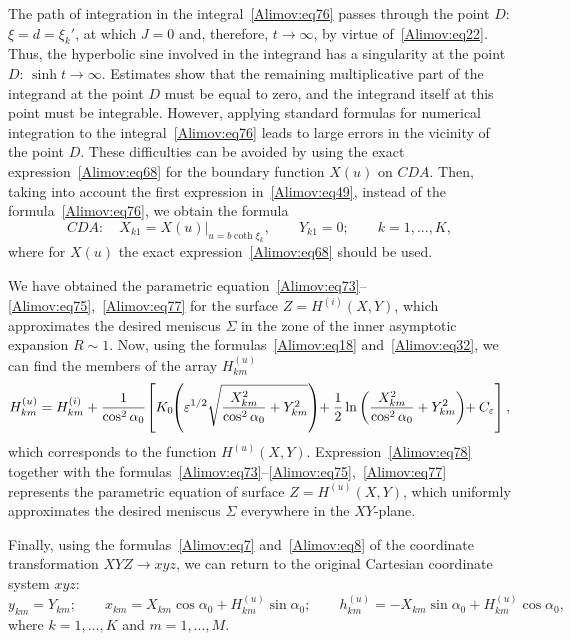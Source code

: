 \documentclass[
11pt,%
tightenlines,%
twoside,%
onecolumn,%
nofloats,%
nobibnotes,%
nofootinbib,%
superscriptaddress,%
noshowpacs,%
centertags]%
{revtex4-2}
\begin{document}
The path of integration in the integral~\eqref{Alimov:eq76} passes through the point $D$: $\xi = d
= \xi_{k}'$, at which $J = 0$ and, therefore, $t \to \infty $, by virtue of~\eqref{Alimov:eq22}.
Thus, the hyperbolic sine involved in the integrand has a singularity at the point $D$: $\sinh t \to
\infty $. Estimates show that the remaining multiplicative part of the integrand at the point $D$
must be equal to zero, and the integrand itself at this point must be integrable. However, applying
standard formulas for numerical integration to the integral~\eqref{Alimov:eq76} leads to large
errors in the vicinity of the point $D$. These difficulties can be avoided by using the exact
expression~\eqref{Alimov:eq68} for the boundary function $X(u)$ on $CDA$. Then, taking into account
the first expression in~\eqref{Alimov:eq49}, instead of the formula~\eqref{Alimov:eq76}, we obtain
the formula
\begin{equation}
\label{Alimov:eq77} CDA: \quad X_{k1} = \left. {X(u)} \right|_{u = b \coth \xi_k }, \quad \quad
Y_{k1} = 0; \quad \quad k = 1,...,K,
\end{equation}
where for $X(u)$ the exact expression~\eqref{Alimov:eq68} should be used.

We have obtained the parametric
equation~\eqref{Alimov:eq73}--\eqref{Alimov:eq75},~\eqref{Alimov:eq77} for the surface $Z =
H^{(i)}(X,Y)$, which approximates the desired meniscus $\Sigma$ in the zone of the inner asymptotic
expansion $R \sim 1$. Now, using the formulas~\eqref{Alimov:eq18} and~\eqref{Alimov:eq32}, we can
find the members of the array $H_{km}^{(u)}$
\begin{equation}
\label{Alimov:eq78} H_{km}^{(u)} =  H_{km}^{(i)} + \frac{1}{\cos^2\alpha_0 }\hspace{-0.5mm}\left[
{K_0\hspace{-1mm}\left( {\varepsilon^{1/2} \sqrt {\frac{X_{km}^2}{\cos^2\alpha_0} + Y_{km}^2}}
\right)\hspace{-1mm} + \frac{1}{2}\ln \left( {\frac{X_{km}^2}{\cos^2\alpha_0} + Y_{km}^2 }
\right)\hspace{-1mm} + C_\varepsilon} \right],
\end{equation}
which corresponds to the function $H^{(u)}(X,Y)$. Expression~\eqref{Alimov:eq78} together
with the formulas~\eqref{Alimov:eq73}--\eqref{Alimov:eq75},~\eqref{Alimov:eq77} represents the
parametric equation of surface $Z = H^{(u)}(X,Y)$, which uniformly approximates the desired
meniscus $\Sigma $ everywhere in the $XY$-plane.

Finally, using the formulas~\eqref{Alimov:eq7} and~\eqref{Alimov:eq8} of the coordinate
transformation $XYZ \to xyz$, we can return to the original Cartesian coordinate system $xyz$:
\begin{equation}
\label{Alimov:eq79} y_{km} = Y_{km}; \quad \quad x_{km} = X_{km} \cos \alpha_0 + H_{km}^{(u)} \sin
\alpha_0; \quad \quad h_{km}^{(u)} = - X_{km} \sin \alpha_0 + H_{km}^{(u)} \cos \alpha_0,
\end{equation}
where $k = 1,...,K$ and $m = 1,...,M$.
\end{document}
